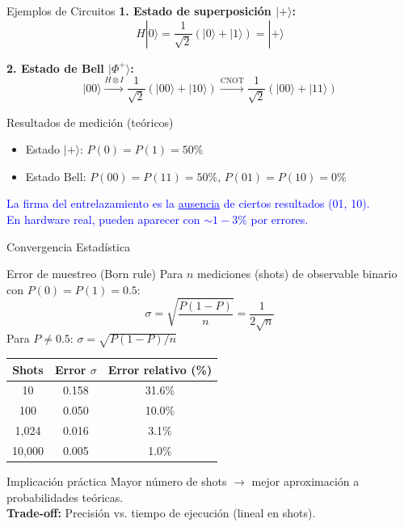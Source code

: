 \documentclass[aspectratio=169]{beamer}
\begin{document}
\begin{frame}{Ejemplos de Circuitos}
\textbf{1. Estado de superposición $|+\rangle$:}
\[
H|0\rangle = \frac{1}{\sqrt{2}}(|0\rangle + |1\rangle) = |+\rangle
\]

\vspace{0.3cm}
\textbf{2. Estado de Bell $|\Phi^+\rangle$:}
\[
|00\rangle \xrightarrow{H \otimes I} \frac{1}{\sqrt{2}}(|00\rangle + |10\rangle) \xrightarrow{\text{CNOT}} \frac{1}{\sqrt{2}}(|00\rangle + |11\rangle)
\]

\vspace{0.3cm}
\begin{block}{Resultados de medición (teóricos)}
\begin{itemize}
\item Estado $|+\rangle$: $P(0) = P(1) = 50\%$
\item Estado Bell: $P(00) = P(11) = 50\%$, $P(01) = P(10) = 0\%$
\end{itemize}
\end{block}

\vspace{0.2cm}
\textcolor{blue}{La firma del entrelazamiento es la \underline{ausencia} de ciertos resultados (01, 10).\\
En hardware real, pueden aparecer con $\sim 1-3\%$ por errores.}
\end{frame}

\begin{frame}{Convergencia Estadística}
\begin{block}{Error de muestreo (Born rule)}
Para $n$ mediciones (shots) de observable binario con $P(0) = P(1) = 0.5$:
\[
\sigma = \sqrt{\frac{P(1-P)}{n}} = \frac{1}{2\sqrt{n}}
\]
Para $P \neq 0.5$: $\sigma = \sqrt{P(1-P)/n}$
\end{block}

\vspace{0.1cm}
\begin{center}
\begin{tabular}{|c|c|c|}
\hline
\textbf{Shots} & \textbf{Error $\sigma$} & \textbf{Error relativo (\%)} \\
\hline
10 & 0.158 & 31.6\% \\
100 & 0.050 & 10.0\% \\
1,024 & 0.016 & 3.1\% \\
10,000 & 0.005 & 1.0\% \\
\hline
\end{tabular}
\end{center}

\vspace{0.3cm}
\begin{exampleblock}{Implicación práctica}
Mayor número de shots $\rightarrow$ mejor aproximación a probabilidades teóricas.\\
\textbf{Trade-off:} Precisión vs. tiempo de ejecución (lineal en shots).
\end{exampleblock}
\end{frame}
\end{document}
